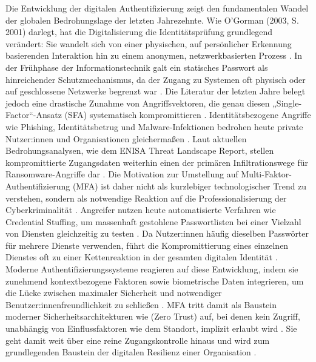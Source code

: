 Die Entwicklung der digitalen Authentifizierung zeigt den fundamentalen Wandel der globalen Bedrohungslage der letzten Jahrezehnte. Wie O’Gorman (2003, S. 2001) darlegt, hat die Digitalisierung die Identitätsprüfung grundlegend verändert: Sie wandelt sich von einer physischen, auf persönlicher Erkennung basierenden Interaktion hin zu einem anonymen, netzwerkbasierten Prozess \cite[S. 2001]{1}. 
In der Frühphase der Informationstechnik galt ein statisches Passwort als hinreichender Schutzmechanismus, da der Zugang zu Systemen oft physisch oder auf geschlossene Netzwerke begrenzt war \cite[S. 80]{1}.
Die Literatur der letzten Jahre belegt jedoch eine drastische Zunahme von Angriffsvektoren, die genau diesen „Single-Factor“-Ansatz (SFA) systematisch kompromittieren \cite[S. 78]{1}. Identitätsbezogene Angriffe wie Phishing, Identitätsbetrug und Malware-Infektionen bedrohen heute private Nutzer:innen und Organisationen gleichermaßen \cite[S. 1]{1}. Laut aktuellen Bedrohungsanalysen, wie dem ENISA Threat Landscape Report, stellen kompromittierte Zugangsdaten weiterhin einen der primären Infiltrationswege für Ransomware-Angriffe dar \cite[S. 27]{1}.
Die Motivation zur Umstellung auf Multi-Faktor-Authentifizierung (MFA) ist daher nicht als kurzlebiger technologischer Trend zu verstehen, sondern als notwendige Reaktion auf die Professionalisierung der Cyberkriminalität \cite[S. 59]{1}. Angreifer nutzen heute automatisierte Verfahren wie {Credential Stuffing}, um massenhaft gestohlene Passwortlisten bei einer Vielzahl von Diensten gleichzeitig zu testen \cite[S. 59]{1}. Da Nutzer:innen häufig dieselben Passwörter für mehrere Dienste verwenden, führt die Kompromittierung eines einzelnen Dienstes oft zu einer Kettenreaktion in der gesamten digitalen Identität \cite[S. 4]{1}.
Moderne Authentifizierungssysteme reagieren auf diese Entwicklung, indem sie zunehmend kontextbezogene Faktoren sowie biometrische Daten integrieren, um die Lücke zwischen maximaler Sicherheit und notwendiger Benutzer:innenfreundlichkeit zu schließen \cite[S. 14]{1}.
MFA tritt damit als Baustein moderner Sicherheitsarchitekturen wie (Zero Trust) auf, bei denen kein Zugriff, unabhängig von Einflussfaktoren wie dem Standort, implizit erlaubt wird \cite[S. 11, 15]{1}.
Sie geht damit weit über eine reine Zugangskontrolle hinaus und wird zum grundlegenden Baustein der digitalen Resilienz einer Organisation \cite[S. iii]{1}.


